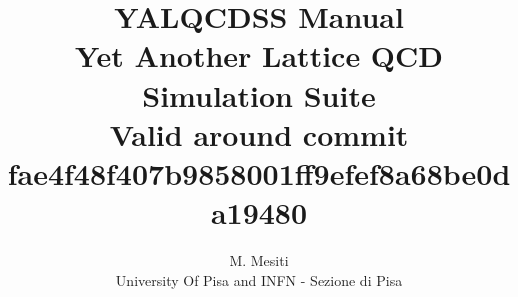 \documentclass[a4paper,10pt]{book}
\title{{\Huge \bf YALQCDSS Manual} \\
Yet Another Lattice QCD Simulation Suite \\
{\small Valid around commit 
fae4f48f407b9858001ff9efef8a68be0da19480}}
\author{M. Mesiti\\{\small University Of Pisa and INFN - Sezione di Pisa}}
\begin{document}
\maketitle
\date{}
 

  

  
  
%  
\end{document}
